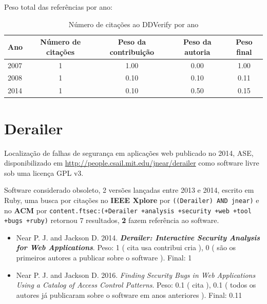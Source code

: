 Peso total das referências por ano:

\begin{table}[h]
\caption{Número de citações ao DDVerify por ano}
\centering
\begin{tabular}{| l | c | c | c | c |}
  \hline
  Ano & Número de citações & Peso da contribuição & Peso da autoria & Peso final \\
  \hline
  2007
    & 1
    & 1.00
    & 0.00
    & 1.00 \\
  2008
    & 1
    & 0.10
    & 0.10
    & 0.11 \\
  2014
    & 1
    & 0.10
    & 0.50
    & 0.15 \\
  \hline
\end{tabular}
\end{table}


\section{Derailer}

Localização de falhas de segurança em aplicações web
publicado no 2014, ASE,
disponibilizado em \url{http://people.csail.mit.edu/jnear/derailer}
como software livre
sob uma licença GPL v3.

Software considerado obsoleto,
2 versões lançadas
entre 2013 e 2014,
escrito em Ruby,
uma busca por citações no {\bf IEEE Xplore} por
\texttt{((Derailer) AND jnear)}
e no {\bf ACM} por
\texttt{content.ftsec:(+Derailer +analysis +security +web +tool +bugs +ruby)}
retornou
7 resultados,
{\bf 2} fazem referência ao software.

\begin{itemize}
\item Near P. J. and Jackson D.
      2014.
        \textbf{\textit{ Derailer: Interactive Security Analysis for Web Applications}}.
      Peso:
      1 (
          cita
          usa
          contribui
          cria
      ),
      0 (
são os primeiros autores a publicar sobre o software
      ).
      Final:
      1

\item Near P. J. and Jackson D.
      2016.
        \textit{ Finding Security Bugs in Web Applications Using a Catalog of Access Control Patterns}.
      Peso:
      0.1 (
          cita
      ),
      0.1 (
todos os autores já publicaram sobre o software em anos anteriores
      ).
      Final:
      0.11

\end{itemize}

